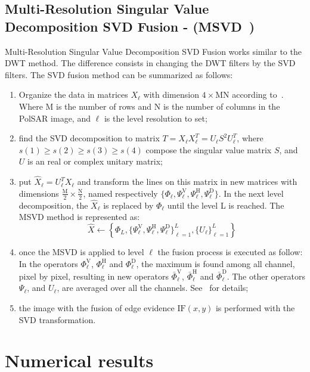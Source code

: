 \documentclass[journal]{IEEEtran}
\begin{document}
\subsection{Multi-Resolution Singular Value Decomposition SVD Fusion - (MSVD~\cite{naidu})}
Multi-Resolution Singular Value Decomposition SVD Fusion works similar to the DWT method. The difference consists in changing the DWT filters by the SVD filters. The SVD fusion method can be summarized as follows:
\begin{enumerate}
\item Organize the data in matrices $X_\ell$ with dimension $4\times\text{MN}$ according to~\cite{naidu}. Where M is the number of rows and N is the number of columns in the PolSAR image, and $\ell$ is the level resolution to set;  
\item find the SVD decomposition to matrix $T=X_\ell X_\ell^T=U_\ell S^2 U_\ell^T$, where $s(1)\geq s(2) \geq s(3) \geq s(4)$ compose the singular value matrix $S$, and $U$ is an real or complex unitary matrix;
\item put $\widehat{X}_\ell=U_\ell^TX_\ell$ and transform the lines on this matrix in new matrices with dimensions $\frac{\text{M}}{2}\times\frac{\text{N}}{2}$, named respectively $\{\Phi_\ell, \Psi_\ell^\text{V}, \Psi_\ell^\text{H}, \Psi_\ell^\text{D}\}$. In the next level decomposition, the $\widehat{X}_\ell$ is replaced by $\Phi_\ell$ until the level L is reached. The MSVD method is represented as:
\begin{equation}\label{msvd_iter}
\widehat{X}\leftarrow \left\{\Phi_L,\{\Psi_\ell^\text{V},\Psi_\ell^\text{H},\Psi_\ell^\text{D} \}_{\ell=1}^L,\{U_\ell\}_{\ell=1}^L \right\}
\end{equation}
\item once the MSVD is applied to level $\ell$ the fusion process is executed as follow: In the operators $\Phi_\ell^\text{V}$, $\Phi_\ell^\text{H}$ and $\Phi_\ell^\text{D}$, the maximum is found among all channel, pixel by pixel, resulting in new operators $\bar{\Phi}_\ell^\text{V}$, $\bar{\Phi}_\ell^\text{H}$ and $\bar{\Phi}_\ell^\text{D}$. The other operators $\Psi_\ell$, and $U_\ell$, are averaged over all the channels. See~\cite{naidu} for details;
\item the image with the fusion of edge evidence $\text{IF}(x,y)$ is performed with the SVD transformation. 
\end{enumerate}
\section{Numerical results}\label{sec_05}
\end{document}
